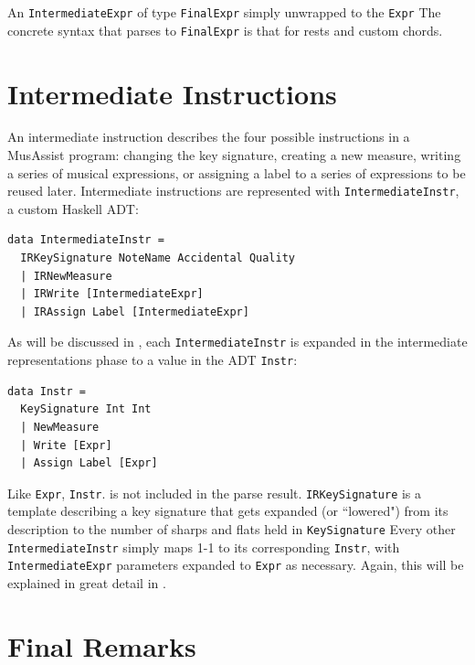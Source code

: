 \documentclass{report}
\begin{document}
An \verb.IntermediateExpr. of type \verb.FinalExpr. simply unwrapped to the \verb.Expr. The concrete syntax that parses to \verb.FinalExpr. is that for rests and custom chords. 

\section{Intermediate Instructions}

An intermediate instruction describes the four possible instructions in a MusAssist program: changing the key signature, creating a new measure, writing a series of musical expressions, or assigning a label to a series of expressions to be reused later. Intermediate instructions are represented with \verb.IntermediateInstr., a custom Haskell ADT:

\begin{verbatim}
data IntermediateInstr = 
  IRKeySignature NoteName Accidental Quality
  | IRNewMeasure
  | IRWrite [IntermediateExpr]
  | IRAssign Label [IntermediateExpr]
\end{verbatim}

As will be discussed in , each \verb.IntermediateInstr. is expanded in the intermediate representations phase to a value in the ADT \verb.Instr.:

\begin{verbatim}
data Instr = 
  KeySignature Int Int 
  | NewMeasure 
  | Write [Expr]
  | Assign Label [Expr] 
\end{verbatim}

Like \verb.Expr., \verb.Instr.. is not included in the parse result. \verb.IRKeySignature. is a template describing a key signature that gets expanded (or ``lowered") from its description to the number of sharps and flats held in \verb.KeySignature. Every other \verb.IntermediateInstr. simply maps 1-1 to its corresponding \verb.Instr., with \verb.IntermediateExpr. parameters expanded to \verb.Expr. as necessary. Again, this will be explained in great detail in .

\section{Final Remarks}
\label{sec:finalremarks}
\end{document}

